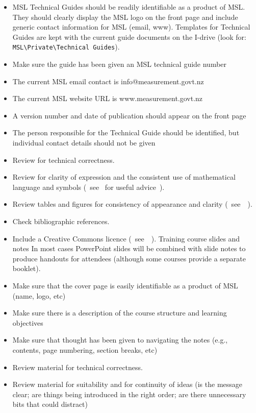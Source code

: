 \begin{itemize}
\item MSL Technical Guides should be readily identifiable as a product of MSL. They should clearly display the MSL logo on the front page and include generic contact information for MSL (email, www). Templates for Technical Guides are kept with the current guide documents on the I-drive (look for: 
\verb|MSL\Private\Technical Guides|).
\item  Make sure the guide has been given an MSL technical guide number
\item  The current MSL email contact is info@measurement.govt.nz
\item  The current MSL website URL is www.measurement.govt.nz
\item   A version number and date of publication should appear on the front page
\item  The person responsible for the Technical Guide should be identified, but individual contact details should not be given
\item  Review for technical correctness.
\item  Review for clarity of expression and the consistent use of mathematical language and symbols (~see~\cite[\S\ref*{GRP-s:scientific_documents}]{MSL_Reporting_Guidelines} for useful advice~).
\item  Review tables and figures for consistency of appearance and clarity (~see~\cite[\S\ref*{GRP-s:scientific_documents}]{MSL_Reporting_Guidelines}~).
\item  Check bibliographic references. 
\item  Include a Creative Commons licence (~see~\cite[\S\ref*{GRP-s_copyright}]{MSL_Reporting_Guidelines}~).
 Training course slides and notes
In most cases PowerPoint slides will be combined with slide notes to produce handouts for attendees (although some courses provide a separate booklet). 
\item  Make sure that the cover page is easily identifiable as a product of MSL (name, logo, etc)
\item  Make sure there is a description of the course structure and learning objectives
\item  Make sure that thought has been given to navigating the notes (e.g., contents, page numbering, section breaks, etc) 
\item  Review material for technical correctness.
\item  Review material for suitability and for continuity of ideas (is the message clear; are things being introduced in the right order; are there unnecessary bits that could distract)

\end{itemize}
